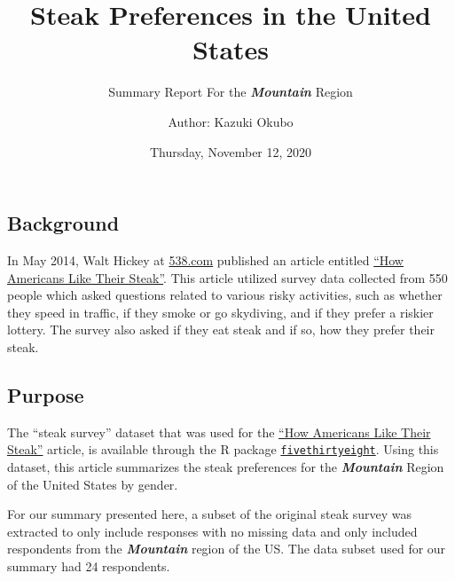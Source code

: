 \documentclass[
]{article}
\title{Steak Preferences in the United States}
\subtitle{Summary Report For the \emph{\textbf{Mountain}} Region}
\author{Author: Kazuki Okubo}
\date{Thursday, November 12, 2020}
\begin{document}
\maketitle

\hypertarget{background}{%
\subsection{Background}\label{background}}

In May 2014, Walt Hickey at \href{http://fivethirtyeight.com/}{538.com}
published an article entitled
\href{https://fivethirtyeight.com/features/how-americans-like-their-steak/}{``How
Americans Like Their Steak''}. This article utilized survey data
collected from 550 people which asked questions related to various risky
activities, such as whether they speed in traffic, if they smoke or go
skydiving, and if they prefer a riskier lottery. The survey also asked
if they eat steak and if so, how they prefer their steak.

\hypertarget{purpose}{%
\subsection{Purpose}\label{purpose}}

The ``steak survey'' dataset that was used for the
\href{https://fivethirtyeight.com/features/how-americans-like-their-steak/}{``How
Americans Like Their Steak''} article, is available through the R
package
\href{https://cran.r-\%20project.org/web/packages/fivethirtyeight/index.html}{\texttt{fivethirtyeight}}.
Using this dataset, this article summarizes the steak preferences for
the \emph{\textbf{Mountain}} Region of the United States by gender.

For our summary presented here, a subset of the original steak survey
was extracted to only include responses with no missing data and only
included respondents from the \emph{\textbf{Mountain}} region of the US.
The data subset used for our summary had 24 respondents.
\end{document}

